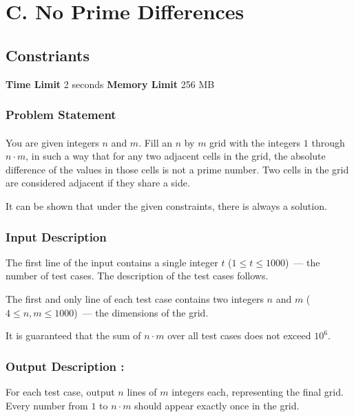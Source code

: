 \documentclass{article}
\begin{document}
\section*{C. No Prime Differences}
\subsection*{Constriants}
\textbf{Time Limit}
2 seconds
\hfill
\textbf{Memory Limit}
256 MB
\subsubsection*{Problem Statement}
\paragraph{}You are given integers $n$ and $m$. Fill an $n$ by $m$ grid with the integers $1$ through $n\cdot m$, in such a way that for any two adjacent cells in the grid, the absolute difference of the values in those cells is not a prime number. Two cells in the grid are considered adjacent if they share a side.  

It can be shown that under the given constraints, there is always a solution.
\paragraph{}
\subsubsection*{Input Description}The first line of the input contains a single integer $t$ ($1 \le t \le 1000$) — the number of test cases. The description of the test cases follows.

The first and only line of each test case contains two integers $n$ and $m$ ($4 \le n, m \le 1000$) — the dimensions of the grid.

It is guaranteed that the sum of $n\cdot m$ over all test cases does not exceed $10^6$.
\paragraph{}
\subsubsection*{Output Description : }For each test case, output $n$ lines of $m$ integers each, representing the final grid. Every number from $1$ to $n\cdot m$ should appear exactly once in the grid.
\end{document}
